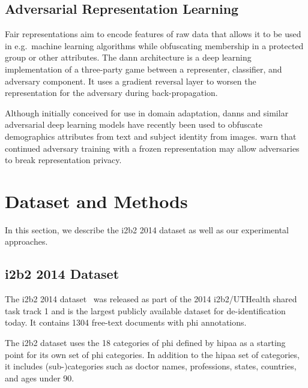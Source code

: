\subsection{Adversarial Representation Learning}
%
Fair representations \citep{zemel2013learning,hamm2015preserving} aim to encode features of raw data that allows it to be used in e.g.\ machine learning algorithms while obfuscating membership in a protected group or other attributes.
%
The \ac{dann} architecture \citep{ganin2016domain} is a deep learning implementation of a three-party game between a representer, classifier, and adversary component.
%
It uses a gradient reversal layer to worsen the representation for the adversary during back-propagation.

%
Although initially conceived for use in domain adaptation, \acp{dann} and similar adversarial deep learning models have recently been used to obfuscate demographics attributes \citep{elazar2018adversarial,li2018towards} from text and subject identity \citep{feutry2018learning} from images.
%
\citet{elazar2018adversarial} warn that continued adversary training with a frozen representation may allow adversaries to break representation privacy.

\section{Dataset and Methods}
%
In this section, we describe the i2b2 2014 dataset as well as our experimental approaches.

\subsection{i2b2 2014 Dataset}
%
The i2b2 2014 dataset~\citep{stubbs2015annotating} was released as part of the 2014 i2b2/UTHealth shared task track 1 and is the largest publicly available dataset for de-identification today.
%
It contains 1304 free-text documents with \ac{phi} annotations.
%

%
The i2b2 dataset uses the 18 categories of \ac{phi} defined by \ac{hipaa} as a starting point for its own set of \ac{phi} categories.
%
In addition to the \ac{hipaa} set of categories, it includes (sub-)categories such as doctor names, professions, states, countries, and ages under 90.

